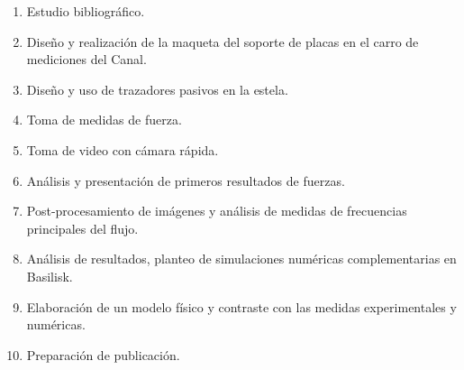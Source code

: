 \documentclass[spanish]{article}
\begin{document}
	
\begin{multicols}{2}
	\begin{enumerate}[nosep]
	\item Estudio bibliográfico.		
	\item Diseño y realización de la maqueta del soporte de placas en el carro de mediciones del Canal.
	\item Diseño y uso de  trazadores pasivos en la estela.
	\item Toma de medidas de fuerza.
	\item Toma de video con cámara rápida.
	\item Análisis y presentación de primeros resultados de fuerzas.
	\item Post-procesamiento de imágenes y análisis de medidas de frecuencias principales del flujo.
	\item Análisis de resultados, planteo  de simulaciones numéricas 
	complementarias en Basilisk.
	\item Elaboración de un modelo físico y contraste con las medidas experimentales y numéricas.
	\item Preparación de publicación.
\end{enumerate}

\end{multicols}	
	
	  
	
\end{document}
